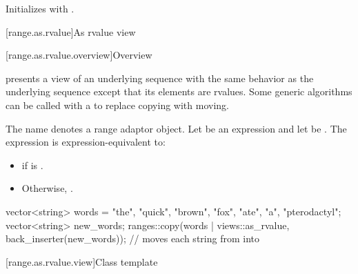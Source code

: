\begin{itemdescr}
\pnum
\effects
Initializes  with .
\end{itemdescr}

[range.as.rvalue]{As rvalue view}

[range.as.rvalue.overview]{Overview}

\pnum
{} presents a view of an underlying sequence
with the same behavior as the underlying sequence
except that its elements are rvalues.
Some generic algorithms can be called with a 
to replace copying with moving.

\pnum
{}%
The name  denotes
a range adaptor object.
Let  be an expression and let  be .
The expression  is expression-equivalent to:
\begin{itemize}
\item
{} if  is .
\item
Otherwise, .
\end{itemize}

\pnum
\begin{example}
\begin{codeblock}
vector<string> words = {"the", "quick", "brown", "fox", "ate", "a", "pterodactyl"};
vector<string> new_words;
ranges::copy(words | views::as_rvalue, back_inserter(new_words));
  // moves each string from  into 
\end{codeblock}
\end{example}

[range.as.rvalue.view]{Class template }

